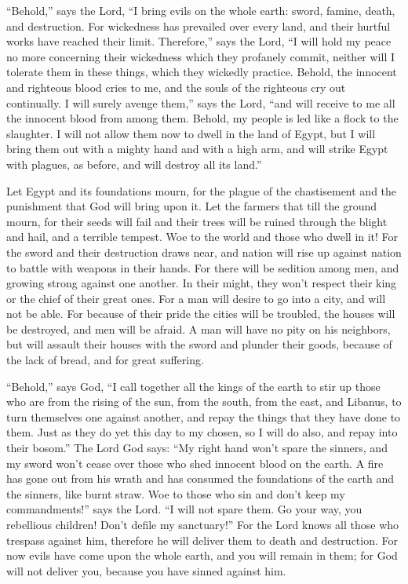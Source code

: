  ``Behold,'' says the Lord, ``I bring evils on the whole
earth: sword, famine, death, and destruction.  For
wickedness has prevailed over every land, and their hurtful works have
reached their limit.  Therefore,'' says the Lord,
 ``I will hold my peace no more concerning their
wickedness which they profanely commit, neither will I tolerate them in
these things, which they wickedly practice. Behold, the innocent and
righteous blood cries to me, and the souls of the righteous cry out
continually.  I will surely avenge them,'' says the Lord,
``and will receive to me all the innocent blood from among them.
 Behold, my people is led like a flock to the slaughter.
I will not allow them now to dwell in the land of Egypt, 
but I will bring them out with a mighty hand and with a high arm, and
will strike Egypt with plagues, as before, and will destroy all its
land.''

 Let Egypt and its foundations mourn, for the plague of
the chastisement and the punishment that God will bring upon it.
 Let the farmers that till the ground mourn, for their
seeds will fail and their trees will be ruined through the blight and
hail, and a terrible tempest.  Woe to the world and those
who dwell in it!  For the sword and their destruction
draws near, and nation will rise up against nation to battle with
weapons in their hands.  For there will be sedition among
men, and growing strong against one another. In their might, they won't
respect their king or the chief of their great ones.  For
a man will desire to go into a city, and will not be able.
 For because of their pride the cities will be troubled,
the houses will be destroyed, and men will be afraid.  A
man will have no pity on his neighbors, but will assault their houses
with the sword and plunder their goods, because of the lack of bread,
and for great suffering.

 ``Behold,'' says God, ``I call together all the kings of
the earth to stir up those who are from the rising of the sun, from the
south, from the east, and Libanus, to turn themselves one against
another, and repay the things that they have done to them.
 Just as they do yet this day to my chosen, so I will do
also, and repay into their bosom.'' The Lord God says: 
``My right hand won't spare the sinners, and my sword won't cease over
those who shed innocent blood on the earth.  A fire has
gone out from his wrath and has consumed the foundations of the earth
and the sinners, like burnt straw.  Woe to those who sin
and don't keep my commandments!'' says the Lord.  ``I
will not spare them. Go your way, you rebellious children! Don't defile
my sanctuary!''  For the Lord knows all those who
trespass against him, therefore he will deliver them to death and
destruction.  For now evils have come upon the whole
earth, and you will remain in them; for God will not deliver you,
because you have sinned against him.

